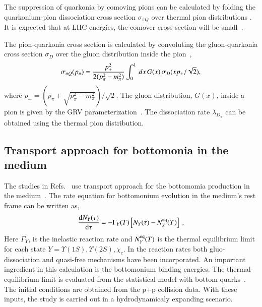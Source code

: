 {  The suppression of quarkonia by comoving pions can be calculated by folding the quarkonium-pion
dissociation cross section $\sigma_{\pi Q}$ over thermal pion distributions \cite{Vogt:1988fj}. 
It is expected  that at LHC energies, the comover cross section will be small~\cite{Lourenco:2008sk}.
{\color{black}
The pion-quarkonia cross section is calculated by convoluting the gluon-quarkonia cross section $\sigma_D$
over the gluon distribution inside the pion~\cite{Arleo:2001mp},
\begin{equation}
\sigma_{\pi Q} (p_{\pi}) = {p_+^2 \over 2(p_\pi^2 - m_\pi^2)} \int_0^1 \, dx \, G(x) \, \sigma_D(xp_+/\sqrt {2}),
\end{equation}
where $p_+ = (p_\pi + \sqrt{p_\pi^2-m_\pi^2})/\sqrt{2}$. The gluon distribution, $G(x)$, inside a pion is 
given by the GRV parameterization~\cite{Gluck:1991ey}. 
The dissociation rate $\lambda_{D_{\pi}}$  can be obtained using the 
thermal pion distribution.




\subsection{Transport approach for bottomonia in the medium}
 The studies in Refs.~\cite{Grandchamp:2005yw,Rapp:2017chc} use 
transport approach for the bottomomia production in the medium~\cite{Grandchamp:2005yw,Rapp:2017chc}.
The rate equation for bottomonium evolution in the medium's rest frame
can be written as,
\begin{equation}
\frac{\mathrm{d} N_Y(\tau)}{\mathrm{d}\tau} =
-\Gamma_Y(T)\left[N_Y(\tau)-N^{\rm eq}_Y(T)\right] \ ,
\end{equation}
Here $\Gamma_Y$, is the inelastic reaction rate  and $N^{\rm eq}_Y(T)$ is the thermal
equilibrium limit  for each state $Y=\Upsilon(1S), \Upsilon(2S), \chi_c$.
In the reaction rates  both gluo-dissociation and quasi-free mechanisms have
been incorporated.  An important ingredient in this calculation is the bottomonium
binding energies. The thermal-equilibrium limit is evaluated from the statistical
model with bottom quarks~\cite{Grandchamp:2002wp}. 
The initial conditions are obtained from the p+p collision data. With these inputs,
the study is carried out in a hydrodynamicaly 
expanding scenario.  




}}
